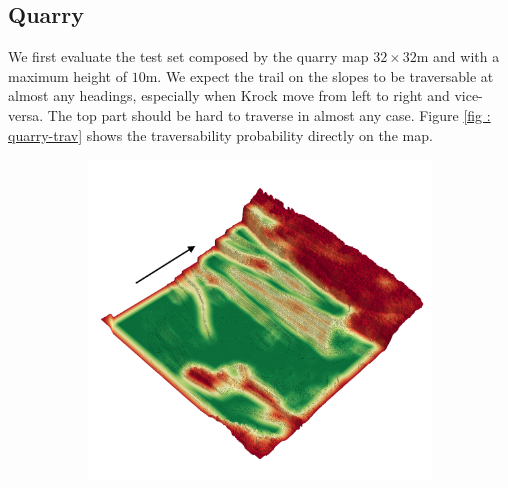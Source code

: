 \documentclass[../document.tex]{subfiles}
\begin{document}
\subsection{Quarry}
We first evaluate the test set composed by the quarry map  $32\times32$m  and with a maximum height of $10$m. We expect the trail on the slopes to be traversable at almost any headings, especially when Krock move from left to right and vice-versa. The top part should be hard to traverse in almost any case. Figure \ref{fig : quarry-trav} shows the traversability probability directly on the map. 
\begin{figure} [htbp]
\centering
\begin{subfigure}[b]{0.45\textwidth}
  \includegraphics[width=\linewidth]{../img/4/traversability/quarry/-270.png} 
\end{subfigure}
\begin{subfigure}[b]{0.45\textwidth}

\end{subfigure}
\end{figure}
\end{document}
